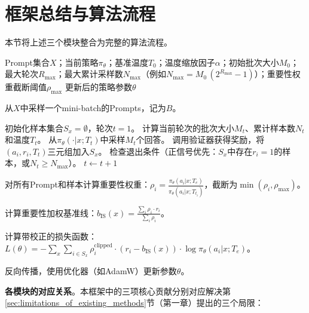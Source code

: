 \section{框架总结与算法流程}
\label{sec:framework_summary}

本节将上述三个模块整合为完整的算法流程。

\begin{algorithm}[htbp]
    \caption{层级几何自适应采样框架（H-GAS）}
    \label{alg:h_gas}
    \begin{algorithmic}[1]
        \Require Prompt集合$X$；当前策略$\pi_\theta$；基准温度$T_0$；温度缩放因子$\alpha$；初始批次大小$M_0$；最大轮次$R_{\max}$；最大累计采样数$N_{\max}$（例如$N_{\max}=M_0\,(2^{R_{\max}}-1)$）；重要性权重截断阈值$\rho_{\max}$
        \Ensure 更新后的策略参数$\theta$
        
            \State 从$X$中采样一个mini-batch的Prompts，记为$B$。
            
                \State 初始化样本集合$S_x = \emptyset$，轮次$t = 1$。
                \Repeat
                    \State 计算当前轮次的批次大小$M_t$、累计样本数$N_t$和温度$T_t$。
                    \State 从$\pi_\theta(\cdot|x; T_t)$中采样$M_t$个回答。
                    \State 调用验证器获得奖励，将$(a_i, r_i, T_t)$三元组加入$S_x$。
                    \State 检查退出条件（正信号优先：$S_x$中存在$r_i = 1$的样本，或$N_t \geq N_{\max}$）。
                    \State $t \gets t + 1$
            \EndFor
            
            \State 对所有Prompt和样本计算重要性权重：$\rho_i = \frac{\pi_\theta(a_i|x; T_e)}{\pi_\theta(a_i|x; T_{t_i})}$，截断为$\min(\rho_i, \rho_{\max})$。
            
            \State 计算重要性加权基准线：$b_{\text{IS}}(x) = \frac{\sum_i \rho_i \cdot r_i}{\sum_i \rho_i}$。
            
            \State 计算带校正的损失函数：$L(\theta) = - \sum_x \sum_{i \in S_x} \rho_i^{\text{clipped}} \cdot (r_i - b_{\text{IS}}(x)) \cdot \log \pi_\theta(a_i | x; T_e)$。
            
            \State 反向传播，使用优化器（如AdamW）更新参数$\theta$。
        \EndFor
    \end{algorithmic}
\end{algorithm}

\textbf{各模块的对应关系}。本框架中的三项核心贡献分别对应解决第\ref{sec:limitations_of_existing_methods}节（第一章）提出的三个局限：

